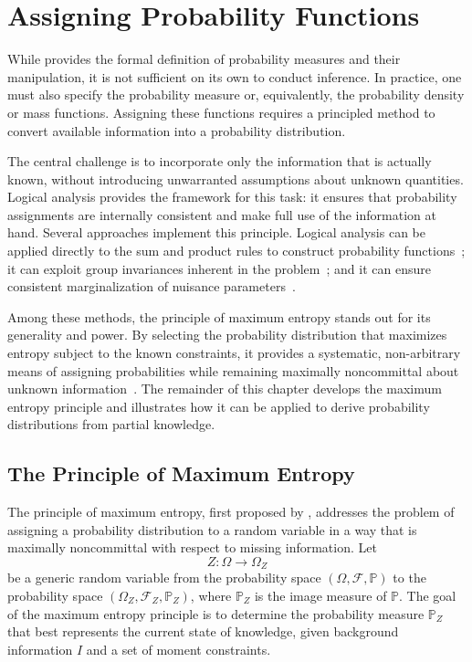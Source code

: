 \chapter{Assigning Probability Functions}
While  provides the formal definition of probability measures and their manipulation, it is not sufficient on its own to conduct inference. In practice, one must also specify the probability measure or, equivalently, the probability density or mass functions. Assigning these functions requires a principled method to convert available information into a probability distribution.

The central challenge is to incorporate only the information that is actually known, without introducing unwarranted assumptions about unknown quantities. Logical analysis provides the framework for this task: it ensures that probability assignments are internally consistent and make full use of the information at hand. Several approaches implement this principle. Logical analysis can be applied directly to the sum and product rules to construct probability functions~\citep{jaynes_11}; it can exploit group invariances inherent in the problem~\citep{jaynes_16}; and it can ensure consistent marginalization of nuisance parameters~\citep{jaynes_21}.

Among these methods, the principle of maximum entropy stands out for its generality and power. By selecting the probability distribution that maximizes entropy subject to the known constraints, it provides a systematic, non-arbitrary means of assigning probabilities while remaining maximally noncommittal about unknown information~\cite{zellner_bayesian_inference, jaynes_16, jaynes_19, shore_17, shore_18}. The remainder of this chapter develops the maximum entropy principle and illustrates how it can be applied to derive probability distributions from partial knowledge.

\section{The Principle of Maximum Entropy}
\label{sec:maxent}
The principle of maximum entropy, first proposed by \citet{Jaynes1957}, addresses the problem of assigning a probability distribution to a random variable in a way that is maximally noncommittal with respect to missing information. Let
\begin{equation}
	Z: \Omega \to \Omega_Z
\end{equation}
be a generic random variable from the probability space $(\Omega, \mathcal{F}, \mathbb{P})$ to the probability space $(\Omega_Z,\mathcal{F}_Z, \mathbb{P}_Z)$, where $\mathbb{P}_Z$ is the image measure of $\mathbb{P}$. The goal of the maximum entropy principle is to determine the probability measure $\mathbb{P}_Z$ that best represents the current state of knowledge, given background information $I$ and a set of moment constraints. 

